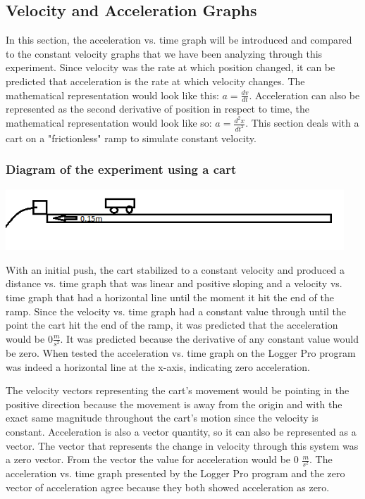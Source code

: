 \documentclass[aps,letterpaper,11pt]{revtex4}
\begin{document}
\subsection{Velocity and Acceleration Graphs}

In this section, the acceleration vs. time graph will be introduced and compared to the constant velocity graphs that we have been analyzing through this experiment. Since velocity was the rate at which position changed, it can be predicted that acceleration is the rate at which velocity changes. The mathematical representation would look like this: $a = \frac{dv}{dt}$. Acceleration can also be represented as the second derivative of position in respect to time, the mathematical representation would look like so: $a = \frac{d^2x}{dt^2}$. This section deals with a cart on a "frictionless" ramp to simulate constant velocity.  

\begin{center}
\subsubsection{Diagram of the experiment using a cart}
\includegraphics[width=5in]{DIACART.png}\\
\end{center}

With an initial push, the cart stabilized to a constant velocity and produced a distance vs. time graph that was linear and positive sloping and a velocity vs. time graph that had a horizontal line until the moment it hit the end of the ramp. Since the velocity vs. time graph had a constant value through until the point the cart hit the end of the ramp, it was predicted that the acceleration would be 0$\frac{m}{s^2}$. It was predicted because the derivative of any constant value would be zero. When tested the acceleration vs. time graph on the Logger Pro program was indeed a horizontal line at the x-axis, indicating zero acceleration. 

The velocity vectors representing the cart's movement would be pointing in the positive direction because the movement is away from the origin and with the exact same magnitude throughout the cart's motion since the velocity is constant. Acceleration is also a vector quantity, so it can also be represented as a vector. The vector that represents the change in velocity through this system was a zero vector. From the vector the value for acceleration would be 0 $\frac{m}{s^2}$. The acceleration vs. time graph presented by the Logger Pro program and the zero vector of acceleration agree because they both showed acceleration as zero.
\end{document}
